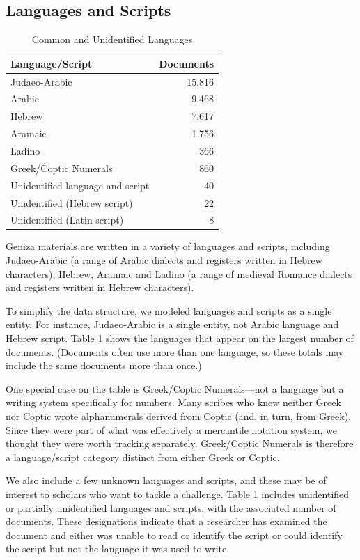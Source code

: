 \documentclass{article}
\begin{document}
\subsection{Languages and Scripts}

\begin{table}
\caption{Common and Unidentified Languages}
\label{table:langs_docs}
\begin{tabular}{lr}
\toprule
Language/Script & Documents \\
\midrule
Judaeo-Arabic & 15,816 \\
Arabic & 9,468 \\
Hebrew & 7,617 \\
Aramaic & 1,756 \\
Ladino & 366 \\
Greek/Coptic Numerals & 860 \\
\midrule
Unidentified language and script & 40 \\
Unidentified (Hebrew script) & 22 \\
Unidentified (Latin script) & 8 \\
\bottomrule
\end{tabular}
\end{table}

Geniza materials are written in a variety of languages and scripts, including Judaeo-Arabic (a range of Arabic dialects and registers written in Hebrew characters), Hebrew, Aramaic and Ladino (a range of medieval Romance dialects and registers written in Hebrew characters).

To simplify the data structure, we modeled languages and scripts as a single entity. For instance, Judaeo-Arabic is a single entity, not Arabic language and Hebrew script. Table \ref{table:langs_docs} shows the languages that appear on the largest number of documents. (Documents often use more than one language, so these totals may include the same documents more than once.) 

One special case on the table is Greek/Coptic Numerals—not a language but a writing system specifically for numbers. Many scribes who knew neither Greek nor Coptic wrote alphanumerals derived from Coptic (and, in turn, from Greek). Since they were part of what was effectively a mercantile notation system, we thought they were worth tracking separately. Greek/Coptic Numerals is therefore a language/script category distinct from either Greek or Coptic.

We also include a few unknown languages and scripts, and these may be of interest to scholars who want to tackle a challenge. Table \ref{table:langs_docs} includes unidentified or partially unidentified languages and scripts, with the associated number of documents. These designations indicate that a researcher has examined the document and either was unable to read or identify the script or could identify the script but not the language it was used to write.
\end{document}
